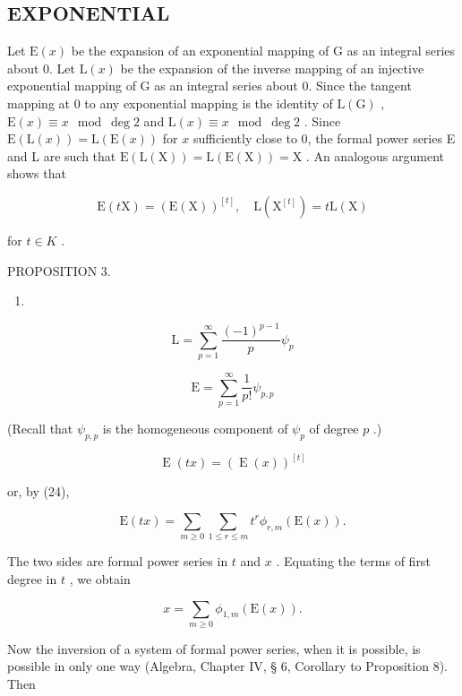 \subsection{EXPONENTIAL}

Let \(\mathrm{E}(x)\) be the expansion of an exponential mapping of G as an integral series about 0. Let \(\mathrm{L}(x)\) be the expansion of the inverse mapping of an injective exponential mapping of G as an integral series about 0. Since the tangent mapping at 0 to any exponential mapping is the identity of \(\mathrm{L}(\mathrm{G})\) , \(\mathrm{E}(x) \equiv x \mod \deg 2\) and \(\mathrm{L}(x) \equiv x \mod \deg 2\) . Since \(\mathrm{E}(\mathrm{L}(x)) = \mathrm{L}(\mathrm{E}(x))\) for \(x\) sufficiently close to 0, the formal power series E and L are such that \(\mathrm{E}(\mathrm{L}(\mathrm{X})) = \mathrm{L}(\mathrm{E}(\mathrm{X})) = \mathrm{X}\) . An analogous argument shows that

\[
\mathrm{E} (t \mathrm{X}) = (\mathrm{E} (\mathrm{X})) ^ {[ t ]}, \quad \mathrm{L} (\mathrm{X} ^ {[ t ]}) = t \mathrm{L} (\mathrm{X})
\]

for \(t \in K\) .

PROPOSITION 3.

\begin{enumerate}
\def\labelenumi{(\arabic{enumi})}
\setcounter{enumi}{26}
\tightlist
\item
\end{enumerate}

\[
\mathrm{L} = \sum_ {p = 1} ^ {\infty} \frac {(- 1) ^ {p - 1}}{p} \psi_ {p}\tag{27}
\]

\[
\mathrm{E} = \sum_ {p = 1} ^ {\infty} \frac {1}{p !} \psi_ {p, p}\tag{28}
\]

(Recall that \(\psi_{p,p}\) is the homogeneous component of \(\psi_{p}\) of degree \(p\) .)

\[
\operatorname{E} (t x) = (\operatorname{E} (x)) ^ {[ t ]}
\]

or, by (24),

\[
\mathrm{E} (t x) = \sum_ {m \geqslant 0} \sum_ {1 \leqslant r \leqslant m} t ^ {r} \phi_ {r, m} (\mathrm{E} (x)).
\]

The two sides are formal power series in \(t\) and \(x\) . Equating the terms of first degree in \(t\) , we obtain

\[
x = \sum_ {m \geqslant 0} \phi_ {1, m} (\mathrm{E} (x)).\tag{29}
\]

Now the inversion of a system of formal power series, when it is possible, is possible in only one way (Algebra, Chapter IV, § 6, Corollary to Proposition 8). Then


